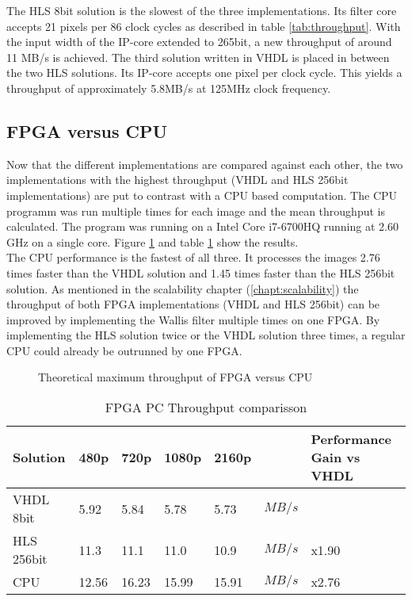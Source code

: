 The HLS 8bit solution is the slowest of the three implementations. Its filter
core accepts 21 pixels per 86 clock cycles as described in table \ref{tab:throughput}. 
With the input width of the IP-core extended to 265bit,
a new throughput of around 11 MB/s is achieved. The third solution written
in VHDL is placed in between the two HLS solutions. Its IP-core accepts one
pixel per clock cycle. This yields a throughput of approximately 5.8MB/s at
125MHz clock frequency.

\clearpage
\subsection{FPGA versus CPU}
Now that the different implementations are compared against each other, the
two implementations with the highest throughput (VHDL and HLS 256bit
implementations) are put to contrast with a CPU based computation.  The CPU
programm was run multiple times for each image and the mean throughput is
calculated. The program was running on a Intel Core i7-6700HQ running at 2.60
GHz on a single core.  Figure \ref{fig:theoreticalmax} and table
\ref{tab:throughputcompare} show the results.
\\

The CPU performance is the fastest of all three. It processes the images 2.76
times faster than the VHDL solution and 1.45 times faster than the HLS 256bit
solution. As mentioned in the scalability chapter (\ref{chapt:scalability}) the
throughput of both FPGA implementations (VHDL and HLS 256bit) can be improved by
implementing the Wallis filter multiple times on one FPGA. By implementing the
HLS solution twice or the VHDL solution three times, a regular CPU could already
be outrunned by one FPGA.

\begin{figure}[b!]
    \centering
    \begin{adjustbox}{max width=\linewidth}
        
    \end{adjustbox}
    \caption{Theoretical maximum throughput of FPGA versus CPU}
    \label{fig:theoreticalmax}
\end{figure}

\begin{table}[b!]
    \centering
    \begin{tabular}{l l l l l l l}
        \toprule
        Solution & 480p & 720p & 1080p & 2160p & & Performance Gain vs VHDL\\
        \midrule
        VHDL 8bit       & 5.92  & 5.84  & 5.78  & 5.73  & $MB/s$ & \\
        HLS  256bit & 11.3  & 11.1  & 11.0  & 10.9  & $MB/s$ & x1.90\\
        CPU        & 12.56 & 16.23 & 15.99 & 15.91 & $MB/s$ & x2.76\\
        \bottomrule
    \end{tabular}
    \caption{FPGA PC Throughput comparisson}
    \label{tab:throughputcompare}
\end{table}

